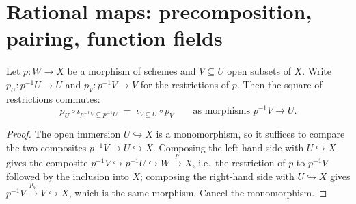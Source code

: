 \section{Rational maps: precomposition, pairing, function fields}
\label{sec:ratmaps}

\begin{lemma}
  \label{lem:ratmap_restrict_square}
  \leanok
  Let \(p : W \to X\) be a morphism of schemes and \(V \subseteq U\) open subsets
  of \(X\). Write \(p_U : p^{-1}U \to U\) and \(p_V : p^{-1}V \to V\) for the
  restrictions of \(p\). Then the square of restrictions commutes:
  \[
    p_U \circ \iota_{p^{-1}V \subseteq p^{-1}U}
    \;=\; \iota_{V \subseteq U} \circ p_V
    \qquad\text{as morphisms } p^{-1}V \to U .
  \]
\end{lemma}
\begin{proof}
  \leanok
  The open immersion \(U \hookrightarrow X\) is a monomorphism, so it suffices to
  compare the two composites \(p^{-1}V \to U \hookrightarrow X\). Composing the
  left-hand side with \(U \hookrightarrow X\) gives the composite
  \(p^{-1}V \hookrightarrow p^{-1}U \hookrightarrow W \xrightarrow{p} X\), i.e.\
  the restriction of \(p\) to \(p^{-1}V\) followed by the inclusion into \(X\);
  composing the right-hand side with \(U \hookrightarrow X\) gives
  \(p^{-1}V \xrightarrow{p_V} V \hookrightarrow X\), which is the same morphism.
  Cancel the monomorphism.
\end{proof}

